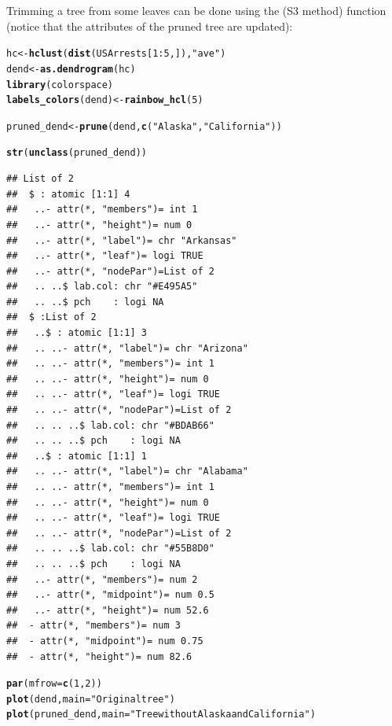\documentclass[shortnames,nojss,article]{jss}\usepackage[]{graphicx}\usepackage[]{color}
\makeatletter
\newcommand{\hlnum}[1]{\textcolor[rgb]{0.686,0.059,0.569}{#1}}%
\newcommand{\hlstr}[1]{\textcolor[rgb]{0.192,0.494,0.8}{#1}}%
\newcommand{\hlopt}[1]{\textcolor[rgb]{0,0,0}{#1}}%
\newcommand{\hlstd}[1]{\textcolor[rgb]{0.345,0.345,0.345}{#1}}%
\newcommand{\hlkwb}[1]{\textcolor[rgb]{0.69,0.353,0.396}{#1}}%
\newcommand{\hlkwc}[1]{\textcolor[rgb]{0.333,0.667,0.333}{#1}}%
\newcommand{\hlkwd}[1]{\textcolor[rgb]{0.737,0.353,0.396}{\textbf{#1}}}%
\newenvironment{kframe}{%
 \def\at@end@of@kframe{}%
 \ifinner\ifhmode%
  \def\at@end@of@kframe{\end{minipage}}%
  \begin{minipage}{\columnwidth}%
 \fi\fi%
 \def\FrameCommand##1{\hskip\@totalleftmargin \hskip-\fboxsep
 \colorbox{shadecolor}{##1}\hskip-\fboxsep
     \hskip-\linewidth \hskip-\@totalleftmargin \hskip\columnwidth}%
 \MakeFramed {\advance\hsize-\width
   \@totalleftmargin\z@ \linewidth\hsize
   \@setminipage}}%
 {\par\unskip\endMakeFramed%
 \at@end@of@kframe}
\newenvironment{knitrout}{}{} %
\makeatother
\begin{document}
Trimming a tree from some leaves can be done using the  (S3 method) function (notice that the attributes of the pruned tree are updated):

\begin{knitrout}
\color{fgcolor}\begin{kframe}
\begin{alltt}
\hlstd{hc} \hlkwb{<-} \hlkwd{hclust}\hlstd{(}\hlkwd{dist}\hlstd{(USArrests[}\hlnum{1}\hlopt{:}\hlnum{5}\hlstd{, ]),} \hlstr{"ave"}\hlstd{)}
\hlstd{dend} \hlkwb{<-} \hlkwd{as.dendrogram}\hlstd{(hc)}
\hlkwd{library}\hlstd{(colorspace)}
\hlkwd{labels_colors}\hlstd{(dend)} \hlkwb{<-} \hlkwd{rainbow_hcl}\hlstd{(}\hlnum{5}\hlstd{)}

\hlstd{pruned_dend} \hlkwb{<-} \hlkwd{prune}\hlstd{(dend,} \hlkwd{c}\hlstd{(}\hlstr{"Alaska"}\hlstd{,} \hlstr{"California"}\hlstd{)}\hlstd{)}

\hlkwd{str}\hlstd{(}\hlkwd{unclass}\hlstd{(pruned_dend))}
\end{alltt}
\begin{verbatim}
## List of 2
##  $ : atomic [1:1] 4
##   ..- attr(*, "members")= int 1
##   ..- attr(*, "height")= num 0
##   ..- attr(*, "label")= chr "Arkansas"
##   ..- attr(*, "leaf")= logi TRUE
##   ..- attr(*, "nodePar")=List of 2
##   .. ..$ lab.col: chr "#E495A5"
##   .. ..$ pch    : logi NA
##  $ :List of 2
##   ..$ : atomic [1:1] 3
##   .. ..- attr(*, "label")= chr "Arizona"
##   .. ..- attr(*, "members")= int 1
##   .. ..- attr(*, "height")= num 0
##   .. ..- attr(*, "leaf")= logi TRUE
##   .. ..- attr(*, "nodePar")=List of 2
##   .. .. ..$ lab.col: chr "#BDAB66"
##   .. .. ..$ pch    : logi NA
##   ..$ : atomic [1:1] 1
##   .. ..- attr(*, "label")= chr "Alabama"
##   .. ..- attr(*, "members")= int 1
##   .. ..- attr(*, "height")= num 0
##   .. ..- attr(*, "leaf")= logi TRUE
##   .. ..- attr(*, "nodePar")=List of 2
##   .. .. ..$ lab.col: chr "#55B8D0"
##   .. .. ..$ pch    : logi NA
##   ..- attr(*, "members")= num 2
##   ..- attr(*, "midpoint")= num 0.5
##   ..- attr(*, "height")= num 52.6
##  - attr(*, "members")= num 3
##  - attr(*, "midpoint")= num 0.75
##  - attr(*, "height")= num 82.6
\end{verbatim}
\begin{alltt}
\hlkwd{par}\hlstd{(}\hlkwc{mfrow} \hlstd{=} \hlkwd{c}\hlstd{(}\hlnum{1}\hlstd{,} \hlnum{2}\hlstd{))}
\hlkwd{plot}\hlstd{(dend,} \hlkwc{main} \hlstd{=} \hlstr{"Original tree"}\hlstd{)}
\hlkwd{plot}\hlstd{(pruned_dend,} \hlkwc{main} \hlstd{=} \hlstr{"Tree without Alaska and California"}\hlstd{)}
\end{alltt}
\end{kframe}


\end{knitrout}
\end{document}
